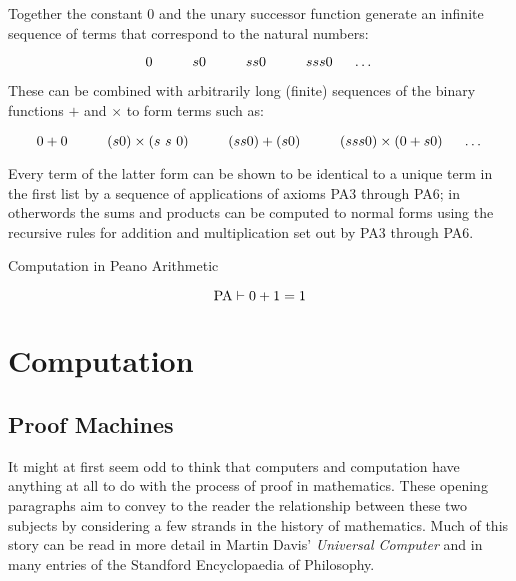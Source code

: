 \documentclass{book}
\begin{document}
    Together the constant 0 and the unary successor function generate an infinite sequence of terms that correspond to the natural numbers: 

    $$0 \hspace{1cm} s 0 \hspace{1cm} s s 0 \hspace{1cm} s s s 0 \hspace{0.5cm} \dots$$

    These can be combined with arbitrarily long (finite) sequences of the binary functions $+$ and $\times$ to form terms such as: 

    $$0 + 0 \hspace{1cm} (s 0) \times (s \ s \ 0) \hspace{1cm} (s s 0) + (s 0) \hspace{1cm} (s s s 0) \times (0 + s 0) \hspace{0.5cm} \dots $$

    Every term of the latter form can be shown to be identical to a unique term in the first list by a sequence of applications of axioms PA3 through PA6; in otherwords the sums and products can be computed to normal forms using the recursive rules for addition and multiplication set out by PA3 through PA6. 

    \begin{eg}{Computation in Peano Arithmetic}

        $$ \text{PA} \vdash 0 + 1 = 1$$

    \end{eg}




\chapter{Computation}

    \newpage
    \section{Proof Machines}

    It might at first seem odd to think that computers and computation have anything at all to do with the process of proof in mathematics. These opening paragraphs aim to convey to the reader the relationship between these two subjects by considering a few strands in the history of mathematics. Much of this story can be read in more detail in Martin Davis' \emph{Universal Computer} and in many entries of the Standford Encyclopaedia of Philosophy.
\end{document}
